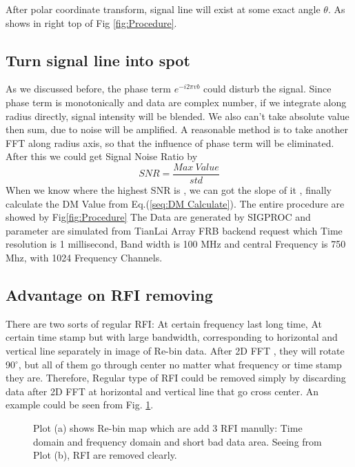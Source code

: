 \documentclass[iop]{emulateapj}
\begin{document}
 After polar coordinate transform, signal line will exist at some exact angle $\theta$. As shows in right top of Fig \ref{fig:Procedure}. 

\subsection{Turn signal line into spot}
As we discussed before, the phase term $e^{-i2\pi vb}$ could disturb the signal. Since phase term is monotonically and data are complex number, if we integrate along radius directly, signal intensity will be blended. We also can't take absolute value then sum,  due to noise will be amplified. A reasonable method is to take another FFT along radius axis, so that the influence of phase term will be eliminated.
After this we could get Signal Noise Ratio by 
\begin{equation*}
SNR = \frac{Max~Value }{std}
\end{equation*}
When we know where the highest SNR is , we can got the slope of it , finally calculate the DM Value from Eq.(\ref{seq:DM Calculate}). 
The entire procedure are showed by Fig\ref{fig:Procedure} The Data are generated by SIGPROC and parameter are simulated from TianLai Array FRB backend request which Time resolution is 1 millisecond, Band width is 100 MHz and central Frequency is 750 Mhz,  with 1024 Frequency Channels.


\subsection{Advantage on RFI removing}
There are two sorts of regular RFI: At certain frequency last long time, At certain time stamp but with large bandwidth, corresponding to horizontal and vertical line separately in image of Re-bin data. After 2D FFT , they will rotate 90$^{\circ}$, but all of them go through center no matter what frequency or time stamp they are. Therefore, Regular type of RFI could be removed simply by discarding data after 2D FFT at horizontal and vertical line that go cross center.%
An example could be seen from Fig. \ref{fig:RFI remove}.

\begin{figure}[ht!]
\centering
{}
\caption{Plot (a) shows Re-bin map which are add 3 RFI manully: Time domain and frequency domain and short bad data area. Seeing from Plot (b), RFI are removed clearly.  \label{fig:RFI remove}}
\end{figure}
\end{document}
